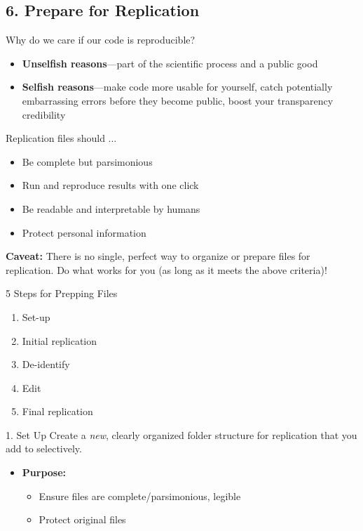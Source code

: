 \documentclass[12pt, compress]{beamer} %
\let\noteitem\item %
\renewcommand{\item}{ 
	\noteitem\vspace{\fill}
	}
\begin{document}
	
\subsection{6. Prepare for Replication}

	\begin{frame}{Why do we care if our code is reproducible?}
		\begin{itemize}
			\item \textbf{Unselfish reasons}---part of the scientific process and a public good
			\item \textbf{Selfish reasons}---make code more usable for yourself, catch potentially embarrassing errors before they become public, boost your transparency credibility
		\end{itemize}
		
	\end{frame}

	\begin{frame}{Replication files should ...}
		\begin{itemize}
			\item Be complete but parsimonious
			\item Run and reproduce results with one click
			\item Be readable and interpretable by humans
			\item Protect personal information
		\end{itemize}
		
		\bigskip
		\textbf{Caveat: }There is no single, perfect way to organize or prepare files for replication. Do what works for you (as long as it meets the above criteria)!
	\end{frame}

	\begin{frame}{5 Steps for Prepping Files}
			\begin{enumerate}
				\item Set-up
				\item Initial replication
				\item De-identify
				\item Edit
				\item Final replication
			\end{enumerate}
	\end{frame}
	  
		 \begin{frame}{1. Set Up}
		 	Create a \textit{new}, clearly organized folder structure for replication that you add to selectively.
		 	
		 	\begin{itemize}
		 		\item \textbf{Purpose:} 
		 		\begin{itemize}
		 			\item Ensure files are \textcolor{burntorange}{complete/parsimonious, legible}
		 			\item Protect original files
		 		\end{itemize}
		 	\end{itemize}
		 	
		 \end{frame}
		  
\end{document}
